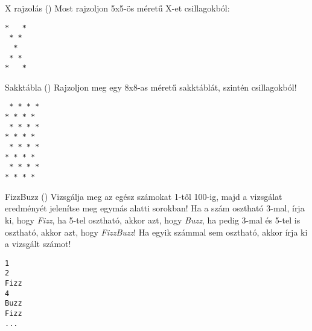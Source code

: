 \begin{frame}[fragile]
    \begin{exampleblock}{X rajzolás ()}
        Most rajzoljon 5x5-ös méretű X-et csillagokból:\\
        \begin{verbatim}
*   *
 * *
  *
 * *
*   *            
\end{verbatim}
    \end{exampleblock}
\end{frame}

\begin{frame}[fragile]
    \begin{exampleblock}{Sakktábla ()}
        Rajzoljon meg egy 8x8-as méretű sakktáblát, szintén csillagokból!\\
        \begin{verbatim}
 * * * *
* * * *
 * * * *
* * * *
 * * * *
* * * *
 * * * *
* * * *
\end{verbatim}
    \end{exampleblock}
\end{frame}

\begin{frame}[fragile]
    \begin{exampleblock}{FizzBuzz ()}
        Vizsgálja meg az egész számokat 1-től 100-ig, majd a vizsgálat eredményét jelenítse meg egymás alatti sorokban! Ha a szám osztható 3-mal, írja ki, hogy \emph{Fizz}, ha 5-tel osztható, akkor azt, hogy \emph{Buzz}, ha pedig 3-mal és 5-tel is osztható, akkor azt, hogy \emph{FizzBuzz}! Ha egyik számmal sem osztható, akkor írja ki a vizsgált számot!\\
        \begin{verbatim}
1
2
Fizz
4
Buzz
Fizz
...
\end{verbatim}
    \end{exampleblock}
\end{frame}
